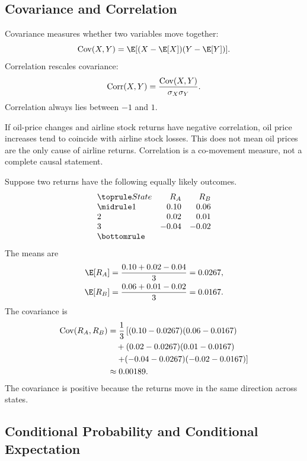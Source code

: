 \subsection{Covariance and Correlation}

Covariance measures whether two variables move together:
\[
    \Cov(X,Y)=\E[(X-\E[X])(Y-\E[Y])].
\]
Correlation rescales covariance:
\[
    \operatorname{Corr}(X,Y)=\frac{\operatorname{Cov}(X,Y)}{\sigma_X\sigma_Y}.
\]
Correlation always lies between $-1$ and $1$.

\begin{exmp}
If oil-price changes and airline stock returns have negative correlation, oil
price increases tend to coincide with airline stock losses. This does not mean
oil prices are the only cause of airline returns. Correlation is a co-movement
measure, not a complete causal statement.
\end{exmp}

\begin{exmp}
Suppose two returns have the following equally likely outcomes.
\[
\begin{array}{@{}lrr@{}}
\toprule
State & R_A & R_B \\
\midrule
1 & 0.10 & 0.06 \\
2 & 0.02 & 0.01 \\
3 & -0.04 & -0.02 \\
\bottomrule
\end{array}
\]
The means are
\[
\begin{aligned}
    \E[R_A]&=\frac{0.10+0.02-0.04}{3}=0.0267,\\
    \E[R_B]&=\frac{0.06+0.01-0.02}{3}=0.0167.
\end{aligned}
\]
The covariance is
\[
\begin{aligned}
    \operatorname{Cov}(R_A,R_B)
    &=
    \frac{1}{3}
    \left[
    (0.10-0.0267)(0.06-0.0167)\right.\\
    &\quad
    +(0.02-0.0267)(0.01-0.0167)\\
    &\quad
    \left.
    +(-0.04-0.0267)(-0.02-0.0167)
    \right]\\
    &\approx 0.00189.
\end{aligned}
\]
The covariance is positive because the returns move in the same direction across
states.
\end{exmp}

\subsection{Conditional Probability and Conditional Expectation}

